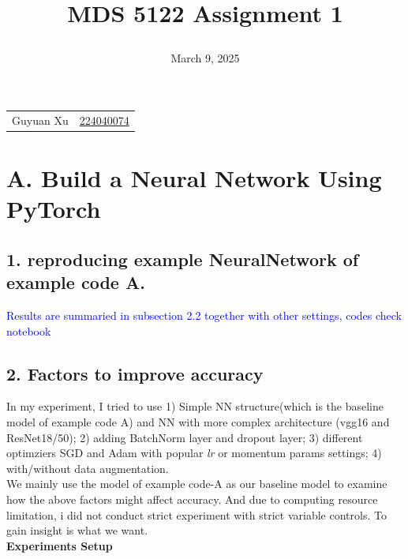 \documentclass{article}
\newcommand{\subs}[1]{\subsection*{#1}}
\newcommand{\secs}[1]{\section*{#1}}
\begin{document}
\title{\raggedright MDS 5122 Assignment 1}
\date{March 9, 2025}
\maketitle

\noindent\begin{tabular}{@{}ll}
   Guyuan Xu &\href{mailto:224040074@link.cuhk.edu.cn}{224040074} \\
    
%
\end{tabular}

\secs{A. Build a Neural Network Using PyTorch}
\subs{1. reproducing example NeuralNetwork of example code A.}
\textcolor{blue}{Results are summaried in subsection 2.2 together with other settings, codes check notebook}

\subs{2. Factors to improve accuracy}
In my experiment, I tried to use 1) Simple NN structure(which is the baseline model of example code A) and NN with more complex architecture (vgg16 and ResNet18/50); 2) adding BatchNorm layer and dropout layer; 3) different optimziers SGD and Adam with popular \textit{lr} or momentum params settings; 4) with/without data augmentation. \\

We mainly use the model of example code-A as our baseline model to examine how the above factors might affect accuracy. And due to computing resource limitation, i did not conduct strict experiment with strict variable controls. To gain insight is what we want.\\



\noindent\textbf{Experiments Setup}\\
\end{document}
